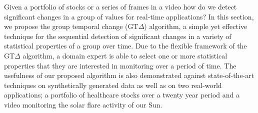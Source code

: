 Given a portfolio of stocks or a series of frames in a video how do we detect significant changes in a group of values for real-time applications? 
In this section,%
 we propose the group temporal change (GT$\Delta$) algorithm, a simple yet effective technique for the sequential detection of significant changes in a variety of statistical properties of a group over time.  
 Due to the flexible framework of the GT$\Delta$ algorithm, a domain expert is able to select one or more statistical properties that they are interested in monitoring over a period of time. The usefulness of our proposed algorithm is also demonstrated against state-of-the-art techniques on synthetically generated data as well as on two real-world applications; a portfolio of healthcare stocks over a twenty year period and a video monitoring the solar flare activity of our Sun.

%
